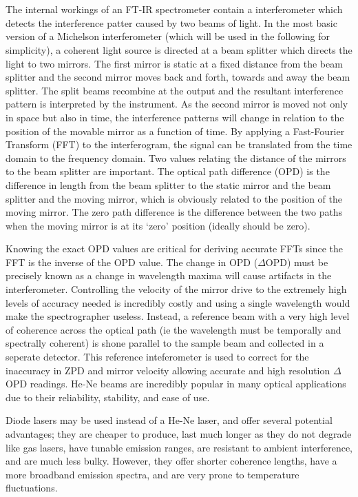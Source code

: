 \documentclass[titlepage]{article}
\begin{document}
\section{}
\setlength{\parindent}{20pt}
\par The internal workings of an FT-IR spectrometer contain a interferometer which detects the interference patter caused by two beams of light. In the most basic version of a Michelson interferometer (which will be used in the following for simplicity), a coherent light source is directed at a beam splitter which directs the light to two mirrors. The first mirror is static at a fixed distance from the beam splitter and the second mirror moves back and forth, towards and away the beam splitter. The split beams recombine at the output and the resultant interference pattern is interpreted by the instrument. As the second mirror is moved not only in space but also in time, the interference patterns will change in relation to the position of the movable mirror as a function of time. By applying a Fast-Fourier Transform (FFT) to the interferogram, the signal can be translated from the time domain to the frequency domain. Two values relating the distance of the mirrors to the beam splitter are important. The optical path difference (OPD) is the difference in length from the beam splitter to the static mirror and the beam splitter and the moving mirror, which is obviously related to the position of the moving mirror. The zero path difference is the difference between the two paths when the moving mirror is at its `zero' position (ideally should be zero). 
\par Knowing the exact OPD values are critical for deriving accurate FFTs since the FFT is the inverse of the OPD value. The change in OPD ($\Delta$OPD) must be precisely known as a change in wavelength maxima will cause artifacts in the interferometer. Controlling the velocity of the mirror drive to the extremely high levels of accuracy needed is incredibly costly and using a single wavelength would make the spectrographer useless. Instead, a reference beam with a very high level of coherence across the optical path (ie the wavelength must be temporally and spectrally coherent) is shone parallel to the sample beam and collected in a seperate detector. This reference inteferometer is used to correct for the inaccuracy in ZPD and mirror velocity allowing accurate and high resolution $\Delta$OPD readings. He-Ne beams are incredibly popular in many optical applications due to their reliability, stability, and ease of use.
\par Diode lasers may be used instead of a He-Ne laser, and offer several potential advantages; they are cheaper to produce, last much longer as they do not degrade like gas lasers, have tunable emission ranges, are resistant to ambient interference, and are much less bulky. However, they offer shorter coherence lengths, have a more broadband emission spectra, and are very prone to temperature fluctuations.
\end{document}
